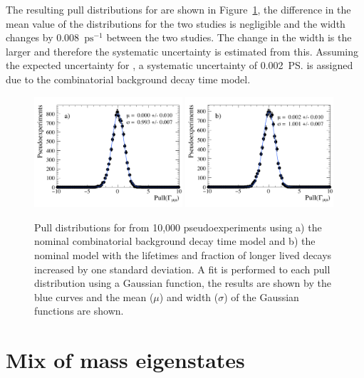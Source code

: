 The resulting pull distributions for \Gmumu are shown in Figure~\ref{fig:CBGextreme}, the difference in the mean value of the distributions for the two studies is negligible and the width changes by 0.008~$\mathrm{ps}^{-1}$ between the two studies. The change in the width is the larger and therefore the systematic uncertainty is estimated from this. Assuming the expected uncertainty for \tmumu, a systematic uncertainty of 0.002~\ps is assigned due to the combinatorial background decay time model.

\begin{figure}[tbp]
  \centering
    \includegraphics[width=0.49\textwidth]{./Figs/LifetimeSystematics/Gamma_pull_mass_pdf_Run1.pdf}
    \includegraphics[width=0.49\textwidth]{./Figs/LifetimeSystematics/Bs2MuMu_gamma_pull_CKM_extremeCBG_DT.pdf}
  \caption{Pull distributions for \Gmumu from 10,000 pseudoexperiments using a) the nominal combinatorial background decay time model and b) the nominal model with the lifetimes and fraction of longer lived decays increased by one standard deviation. A fit is performed to each pull distribution using a Gaussian function, the results are shown by the blue curves and the mean ($\mu$) and width ($\sigma$) of the Gaussian functions are shown.}
  \label{fig:CBGextreme}
\end{figure}


\section[Mix of \bs mass eigenstates]{Mix of \boldmath{\bs} mass eigenstates}
\label{sec:mixofeigenstates}

